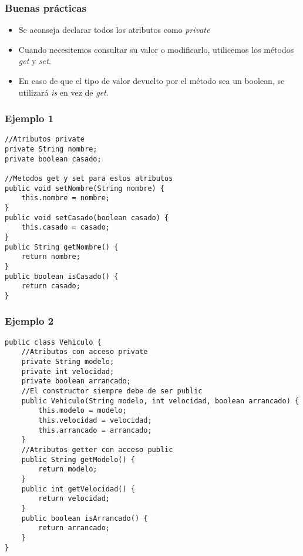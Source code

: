 \documentclass{beamer}
\begin{document}
\begin{frame}
\frametitle{Buenas prácticas}
\begin{itemize}[<+->]
\item Se aconseja declarar todos los atributos como \emph{private}
\item Cuando necesitemos consultar su valor o modificarlo, utilicemos los métodos \emph{get} y \emph{set}.
\item En caso de que el tipo de valor devuelto por el método sea un boolean, se utilizará \emph{is} en vez de \emph{get}.
\end{itemize}
\pause
\end{frame}


\begin{frame}[fragile]
\frametitle{Ejemplo 1}
\begin{verbatim}
//Atributos private
private String nombre;
private boolean casado;
 
//Metodos get y set para estos atributos
public void setNombre(String nombre) {
    this.nombre = nombre;
}
public void setCasado(boolean casado) {
    this.casado = casado;
}
public String getNombre() {
    return nombre;
}
public boolean isCasado() {
    return casado;
}
\end{verbatim}
\end{frame}

\begin{frame}[fragile]
\frametitle{Ejemplo 2}
\begin{footnotesize}
\begin{verbatim}
public class Vehiculo {
    //Atributos con acceso private
    private String modelo;
    private int velocidad;
    private boolean arrancado;
    //El constructor siempre debe de ser public
    public Vehiculo(String modelo, int velocidad, boolean arrancado) {
        this.modelo = modelo;
        this.velocidad = velocidad;
        this.arrancado = arrancado;
    }  
    //Atributos getter con acceso public
    public String getModelo() {
        return modelo;
    } 
    public int getVelocidad() {
        return velocidad;
    } 
    public boolean isArrancado() {
        return arrancado;
    }
}
\end{verbatim}
\end{footnotesize}
\end{frame}
\end{document}
